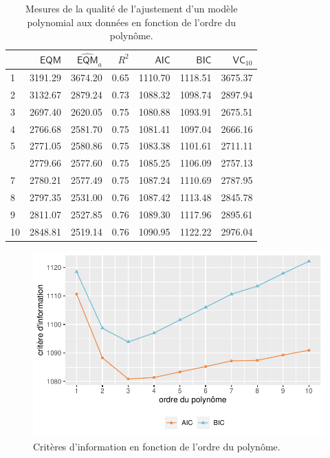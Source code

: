 \documentclass[
  11pt,
  letterpaper,
]{scrbook}
\theoremstyle{definition}
\theoremstyle{remark}
\begin{document}
\hypertarget{tbl-polynome-ajustement}{}
\begin{table}
\caption{\label{tbl-polynome-ajustement}Mesures de la qualité de l'ajustement d'un modèle polynomial aux données
en fonction de l'ordre du polynôme. }\tabularnewline

\centering
\begin{tabular}{lrrrrrr}
\toprule
  & \(\mathsf{EQM}\) & \(\widehat{\mathsf{EQM}}_a\) & \(R^2\) & \(\mathsf{AIC}\) & \(\mathsf{BIC}\) & \(\mathsf{VC}_{10}\)\\
\midrule
1 & 3191.29 & 3674.20 & 0.65 & 1110.70 & 1118.51 & 3675.37\\
2 & 3132.67 & 2879.24 & 0.73 & 1088.32 & 1098.74 & 2897.94\\
3 & 2697.40 & 2620.05 & 0.75 & 1080.88 & 1093.91 & 2675.51\\
4 & 2766.68 & 2581.70 & 0.75 & 1081.41 & 1097.04 & 2666.16\\
5 & 2771.05 & 2580.86 & 0.75 & 1083.38 & 1101.61 & 2711.11\\
\addlinespace
6 & 2779.66 & 2577.60 & 0.75 & 1085.25 & 1106.09 & 2757.13\\
7 & 2780.21 & 2577.49 & 0.75 & 1087.24 & 1110.69 & 2787.95\\
8 & 2797.35 & 2531.00 & 0.76 & 1087.42 & 1113.48 & 2845.78\\
9 & 2811.07 & 2527.85 & 0.76 & 1089.30 & 1117.96 & 2895.61\\
10 & 2848.81 & 2519.14 & 0.76 & 1090.95 & 1122.22 & 2976.04\\
\bottomrule
\end{tabular}
\end{table}

\begin{figure}[ht!]

{\centering \includegraphics[width=1\textwidth,height=\textheight]{./04-selectionmodeles_files/figure-pdf/fig-polynome-ajustement-1.pdf}

}

\caption{\label{fig-polynome-ajustement}Critères d'information en
fonction de l'ordre du polynôme.}

\end{figure}
\end{document}
